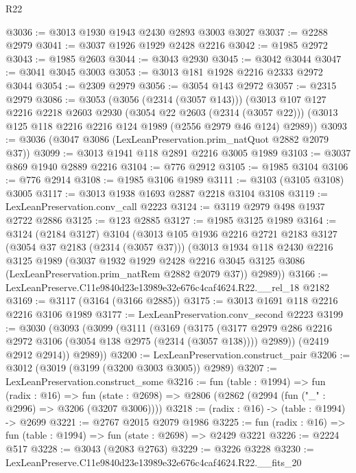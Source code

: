 \begin{lexlean}{R22}
\begin{coremodule}
@3036 := @3013 @1930 @1943 @2430 @2893 @3003 @3027
@3037 := @2288 @2979
@3041 := @3037 @1926 @1929 @2428 @2216
@3042 := @1985 @2972
@3043 := @1985 @2603
@3044 := @3043 @2930
@3045 := @3042 @3044
@3047 := @3041 @3045 @3003
@3053 := @3013 @181 @1928 @2216 @2333 @2972 @3044
@3054 := @2309 @2979
@3056 := @3054 @143 @2972
@3057 := @2315 @2979
@3086 := @3053
    (@3056 (@2314 (@3057 @143)))
    (@3013
      @107
      @127
      @2216
      @2218
      @2603
      @2930
      (@3054 @22 @2603 (@2314 (@3057 @22)))
      (@3013 @125 @118 @2216 @2216 @124 @1989 (@2556 @2979 @46 @124) @2989))
@3093 := @3036 (@3047 @3086 (LexLeanPreservation.prim_natQuot @2882 @2079 @37))
@3099 := @3013 @1941 @118 @2891 @2216 @3005 @1989
@3103 := @3037 @869 @1940 @2889 @2216
@3104 := @776 @2912
@3105 := @1985 @3104
@3106 := @776 @2914
@3108 := @1985 @3106 @1989
@3111 := @3103 (@3105 @3108) @3005
@3117 := @3013 @1938 @1693 @2887 @2218 @3104 @3108
@3119 := LexLeanPreservation.conv_call @2223
@3124 := @3119 @2979 @498 @1937 @2722 @2886
@3125 := @123 @2885
@3127 := @1985 @3125 @1989
@3164 := @3124
    (@2184 @3127)
    @3104
    (@3013
      @105
      @1936
      @2216
      @2721
      @2183
      @3127
      (@3054 @37 @2183 (@2314 (@3057 @37)))
      (@3013
        @1934
        @118
        @2430
        @2216
        @3125
        @1989
        (@3037
          @1932
          @1929
          @2428
          @2216
          @3045
          @3125
          @3086
          (LexLeanPreservation.prim_natRem @2882 @2079 @37))
        @2989))
@3166 := LexLeanPreserve.C11e9840d23e13989e32e676c4caf4624.R22.__rel_18 @2182
@3169 := @3117 (@3164 (@3166 @2885))
@3175 := @3013 @1691 @118 @2216 @2216 @3106 @1989
@3177 := LexLeanPreservation.conv_second @2223
@3199 := @3030
    (@3093
      (@3099
        (@3111
          (@3169
            (@3175
              (@3177 @2979 @286 @2216 @2972 @3106 (@3054 @138 @2975 (@2314 (@3057 @138))))
              @2989))
          (@2419 @2912 @2914))
        @2989))
@3200 := LexLeanPreservation.construct_pair
@3206 := @3012 (@3019 (@3199 (@3200 @3003 @3005)) @2989)
@3207 := LexLeanPreservation.construct_some
@3216 := fun (table : @1994) =>
  fun (radix : @16) =>
  fun (state : @2698) => @2806 (@2862 (@2994 (fun ("_" : @2996) => @3206 (@3207 @3006))))
@3218 := (radix : @16) -> (table : @1994) -> @2699
@3221 := @2767 @2015 @2079 @1986
@3225 := fun (radix : @16) => fun (table : @1994) => fun (state : @2698) => @2429 @3221
@3226 := @2224 @517
@3228 := @3043 (@2083 @2763)
@3229 := @3226 @3228
@3230 := LexLeanPreserve.C11e9840d23e13989e32e676c4caf4624.R22.__fits_20

\end{coremodule}
\end{lexlean}
